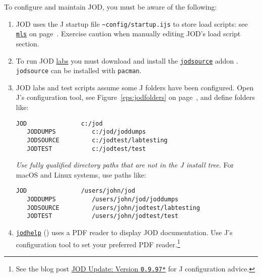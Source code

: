 To configure and maintain JOD, you must be aware of the following:
\begin{enumerate}
	\item JOD uses the J startup file \verb|~config/startup.ijs| to store load scripts: see 
	\hyperlink{il:mls}{\texttt{mls}} on page~\pageref{ss:mls}.  Exercise caution when manually
	editing JOD's load script section.
	\item To run JOD \href{https://code.jsoftware.com/wiki/Labs/Migration}{labs} you must download and install the
	 \href{https://www.jsoftware.com/jwiki/Addons/general/jodsource}{\texttt{jodsource}} addon \cite{baker:jodsource}. 
	 \texttt{jodsource} can be installed with \texttt{pacman}.
	\item JOD labs and test scripts assume some J folders have been configured.  Open J's
	configuration tool, see Figure~\ref{eps:jodfolders} on 
   page~\pageref{eps:jodfolders}, and
	define folders like:
	\begin{lstlisting}[frame=single,framerule=0pt,label=lst:foldercfg]
   JOD               c:/jod
   JODDUMPS          c:/jod/joddumps
   JODSOURCE         c:/jodtest/labtesting
   JODTEST           c:/jodtest/test
  \end{lstlisting}
  \emph{Use fully qualified directory paths that are not in the J install tree.}
  For macOS and Linux systems, use paths like:
  \begin{lstlisting}[frame=single,framerule=0pt,label=lst:foldercfgunix]
   JOD               /users/john/jod
   JODDUMPS          /users/john/jod/joddumps
   JODSOURCE         /users/john/jodtest/labtesting
   JODTEST           /users/john/jodtest/test
  \end{lstlisting}
  \item \hyperlink{il:jodhelp}{\texttt{jodhelp}} (\pageref{ss:jodhelp}) uses a 
  PDF reader to display JOD documentation. Use J's configuration tool to set 
  your preferred PDF reader.\footnote{See the blog post \href{https://bakerjd99.wordpress.com/2015/03/22/jod-update-version-0-9-97/}{JOD Update: Version \texttt{0.9.97*}} for J configuration advice.
  } 
\end{enumerate} 



